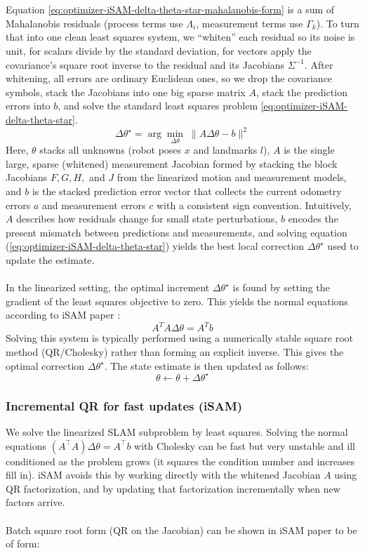 \\ \\
Equation \eqref{eq:optimizer-iSAM-delta-theta-star-mahalanobis-form} is a sum of Mahalanobis residuals (process terms use $\Lambda_i$, measurement terms use $\Gamma_k$). To turn that into one clean least squares system, we ``whiten'' each residual so its noise is unit, for scalars divide by the standard deviation, for vectors apply the covariance's square root inverse to the residual and its Jacobians $\Sigma^{-1}$. After whitening, all errors are ordinary Euclidean ones, so we drop the covariance symbols, stack the Jacobians into one big sparse matrix $A$, stack the prediction errors into $b$, and solve the standard least squares problem \eqref{eq:optimizer-iSAM-delta-theta-star}.
\begin{equation}
    \Delta\theta^\star = \arg\min_{\Delta\theta}\; \|A\Delta\theta - b\|^2
    \label{eq:optimizer-iSAM-delta-theta-star}
\end{equation}
Here, $\theta$ stacks all unknowns (robot poses $x$ and landmarks $l$), $A$ is the single large, sparse (whitened) measurement Jacobian formed by stacking the block Jacobians $F, G, H,$ and $J$ from the linearized motion and measurement models, and $b$ is the stacked prediction error vector that collects the current odometry errors $a$ and measurement errors $c$ with a consistent sign convention. Intuitively, $A$ describes how residuals change for small state perturbations, $b$ encodes the present mismatch between predictions and measurements, and solving equation (\ref{eq:optimizer-iSAM-delta-theta-star}) yields the best local correction $\Delta\theta^\star$ used to update the estimate.
\\ \\
In the linearized setting, the optimal increment $\Delta\theta^\star$ is found by setting the gradient of the least squares objective to zero. This yields the normal equations according to \gls{iSAM} paper \cite{iSAM_paper}:
$$
    A^{T}A\Delta\theta = A^{T}b
$$
Solving this system is typically performed using a numerically stable square root method (QR/Cholesky) rather than forming an explicit inverse. This gives the optimal correction $\Delta\theta^\star$. The state estimate is then updated as follows:
$$
    \theta \leftarrow \theta + \Delta\theta^\star
$$



\subsubsection{Incremental QR for fast updates (iSAM)}
We solve the linearized \gls{SLAM} subproblem by least squares. Solving the normal equations $(A^\top A)\Delta\theta = A^\top b$ with Cholesky can be fast but very unstable and ill conditioned as the problem grows (it squares the condition number and increases fill in). \gls{iSAM} avoids this by working directly with the whitened Jacobian $A$ using QR factorization, and by updating that factorization incrementally when new factors arrive.
\\ \\
Batch square root form (QR on the Jacobian) can be shown in \gls{iSAM} paper \cite{iSAM_paper} to be of form:

